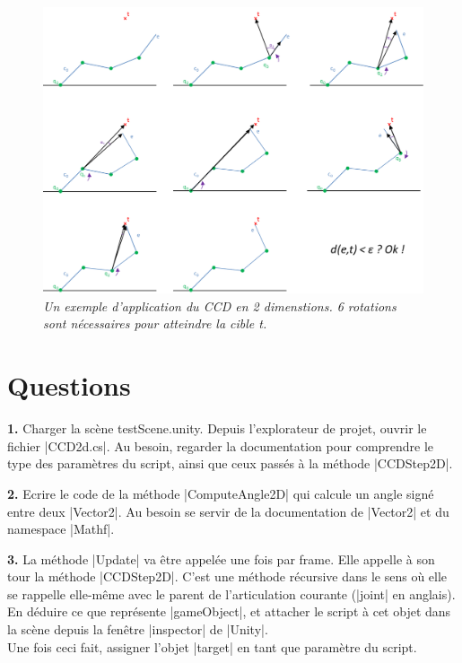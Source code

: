\documentclass{article}
\newcommand{\question}[2]{{\noindent \bf #1} #2}
\begin{document}
   \begin{figure}[htb]
  \centering
    \includegraphics[width=1\linewidth]{CCDALL}
  \caption{
          \textit{Un exemple d'application du CCD en 2 dimenstions. 6 rotations sont n\'ecessaires pour atteindre la cible t.}}
		   \label{CCDALL}
\end{figure}


\section{Questions}
\label{implementation}

\question{1.}Charger la sc\`ene testScene.unity. Depuis l'explorateur de projet, ouvrir le fichier |CCD2d.cs|. Au besoin, regarder
la documentation pour comprendre le type des param\`etres du script, ainsi que ceux pass\'es \`a la m\'ethode |CCDStep2D|.\newline


\question{2.}Ecrire le code de la m\'ethode |ComputeAngle2D| qui calcule un angle sign\'e entre deux |Vector2|. Au besoin se servir de la documentation
de |Vector2| et du namespace |Mathf|.\newline

\question{3.}La m\'ethode |Update| va \^etre appel\'ee une fois par frame. Elle appelle \`a son tour la m\'ethode |CCDStep2D|. C'est une m\'ethode r\'ecursive dans le sens o\`u elle se rappelle elle-m\^eme
avec le parent de l'articulation courante (|joint| en anglais). \\
En d\'eduire ce que repr\'esente |gameObject|, et attacher le script \`a cet objet dans la sc\`ene depuis la fen\^etre |inspector| de |Unity|. \\
Une fois ceci fait, assigner l'objet |target| en tant que param\`etre du script. \newline
\end{document}
